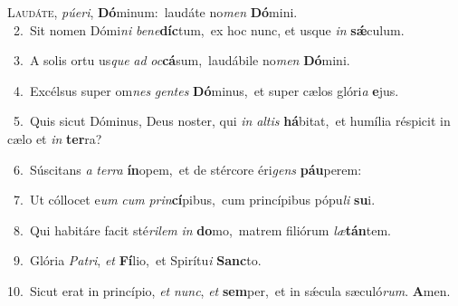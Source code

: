 \lettrine{\initial\textcolor{\initialcolor}{L}}{audáte,} \textit{pú}\-\textit{e}\textit{ri}, \textbf{Dó}\-minum:~\star laudáte no\textit{men} \textbf{Dó}\-mini.\\
{\numbfont\textcolor{\numbcolor}{~2.}}~Sit nomen Dómi\textit{ni} \textit{be}\-\textit{ne}\textbf{díc}tum,~\star ex hoc nunc, et usque \textit{in} \textbf{sǽ}\-culum.\par
{\numbfont\textcolor{\numbcolor}{~3.}}~A solis ortu us\textit{que} \textit{ad} \textit{oc}\-\textbf{cá}sum,~\star laudábile no\textit{men} \textbf{Dó}\-mini.\par
{\numbfont\textcolor{\numbcolor}{~4.}}~Excélsus super om\textit{nes} \textit{gen}\-\textit{tes} \textbf{Dó}\-minus,~\star et super cælos glóri\textit{a} \textbf{e}\-jus.\par
{\numbfont\textcolor{\numbcolor}{~5.}}~Quis sicut Dóminus, Deus noster, qui \textit{in} \textit{al}\-\textit{tis} \textbf{há}\-bitat,~\star et humília réspicit in cælo et \textit{in} \textbf{ter}\-ra?\par
{\numbfont\textcolor{\numbcolor}{~6.}}~Súscitans \textit{a} \textit{ter}\-\textit{ra} \textbf{ín}\-opem,~\star et de stércore éri\textit{gens} \textbf{páu}\-perem:\par
{\numbfont\textcolor{\numbcolor}{~7.}}~Ut cóllocet e\textit{um} \textit{cum} \textit{prin}\-\textbf{cí}pibus,~\star cum princípibus pópu\textit{li} \textbf{su}\-i.\par
{\numbfont\textcolor{\numbcolor}{~8.}}~Qui habitáre facit sté\-\textit{ri}\-\textit{lem} \textit{in} \textbf{do}\-mo,~\star matrem filiórum \textit{læ}\-\textbf{tán}tem.\par
{\numbfont\textcolor{\numbcolor}{~9.}}~Glória \textit{Pa}\-\textit{tri}, \textit{et} \textbf{Fí}\-lio,~\star et Spirítu\textit{i} \textbf{Sanc}\-to.\par
{\numbfont\textcolor{\numbcolor}{10.}}~Sicut erat in princípio, \textit{et} \textit{nunc}\-, \textit{et} \textbf{sem}\-per,~\star et in sǽcula sæculó\-\textit{rum}\-. \textbf{A}\-men.\par
